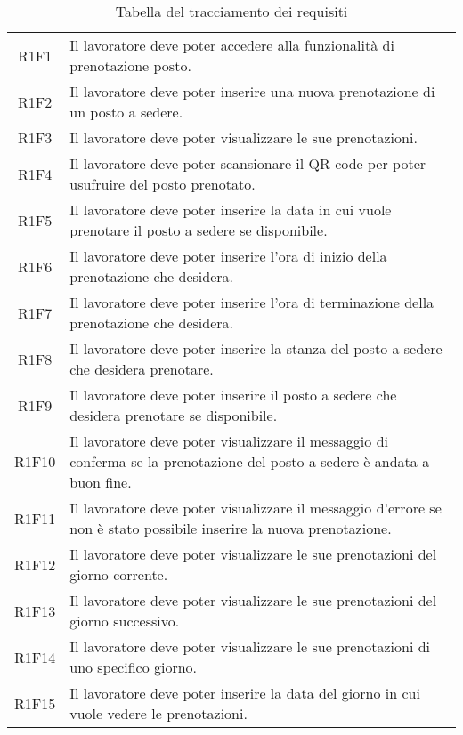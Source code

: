 \begin{table}[h]%
		\renewcommand{\arraystretch}{1.5}
	\centering
	\begin{tabularx}{\textwidth}{c X}
		\hline	
		\rowcolor{heavenly}
		\intest{Codice} &  \intest{Descrizione} \\	
		\hline			
		R1F1 & Il lavoratore deve poter accedere alla funzionalità di prenotazione posto.\\
		R1F2 & Il lavoratore deve poter inserire una nuova prenotazione di un posto a sedere.\\
		R1F3 & Il lavoratore deve poter visualizzare le sue prenotazioni.\\
		R1F4 & Il lavoratore deve poter scansionare il \gls{QR code}\ap{[g]} per poter usufruire del posto prenotato.\\
		R1F5 & Il lavoratore deve poter inserire la data in cui vuole prenotare il posto a sedere se disponibile.\\
		R1F6 & Il lavoratore deve poter inserire l'ora di inizio della prenotazione che desidera.\\
		R1F7 & Il lavoratore deve poter inserire l'ora di terminazione della prenotazione che desidera.\\
		R1F8 & Il lavoratore deve poter inserire la stanza del posto a sedere che desidera prenotare.\\
		R1F9 & Il lavoratore deve poter inserire il posto a sedere che desidera prenotare se disponibile.\\
		R1F10 & Il lavoratore deve poter visualizzare il messaggio di conferma se la prenotazione del posto a sedere è andata a buon fine.\\
		R1F11 & Il lavoratore deve poter visualizzare il messaggio d'errore se non è stato possibile inserire la nuova prenotazione.\\
		R1F12 & Il lavoratore deve poter visualizzare le sue prenotazioni del giorno corrente.\\
		R1F13 & Il lavoratore deve poter visualizzare le sue prenotazioni del giorno successivo.\\
		R1F14 & Il lavoratore deve poter visualizzare le sue prenotazioni di uno specifico giorno.\\
		R1F15 & Il lavoratore deve poter inserire la data del giorno in cui vuole vedere le prenotazioni.\\
	
		\hline	
	\end{tabularx} \hbox{}
	\caption{Tabella del tracciamento dei requisiti}
\end{table}%


